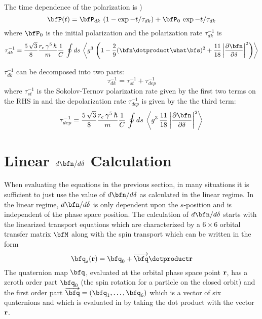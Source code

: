 {The time dependence of the polarization is \cite{b:barber99})
\begin{equation}
  \bfP(t) = \bfP_{dk} \, \left( 1 - \exp{-t/\tau_{dk}} \right) + \bfP_0 \, \exp{-t/\tau_{dk}}
\end{equation}
where $\bfP_0$ is the initial polarization and the polarization rate $\tau_{dk}^{-1}$ is 
\begin{equation}
  \tau_{dk}^{-1} = \frac{5 \, \sqrt{3}}{8} \frac{r_e \, \gamma^5 \, \hbar}{m}
  \frac{1}{C} \, \oint ds \, \left< g^3 \, \left( 1 - \frac{2}{9} (\bfn \dotproduct \what\bfs)^2 + 
  \frac{11}{18} \left| \frac{\partial \bfn}{\partial \delta} \right|^2 \right) \right>
  \label{t583}
\end{equation}

$\tau_{dk}^{-1}$ can be decomposed into two parts:
\begin{equation}
  \tau_{dk}^{-1} = \tau_{st}^{-1} + \tau_{dep}^{-1}
  \label{tdk}
\end{equation}
where $\tau_{st}^{-1}$ is the Sokolov-Ternov polarization rate given by the first two terms on the
RHS in  and the depolarization rate $\tau_{dep}^{-1}$ is given by the the third term:
\begin{equation}
  \tau_{dep}^{-1} = \frac{5 \, \sqrt{3}}{8} \frac{r_e \, \gamma^5 \, \hbar}{m}
  \frac{1}{C} \, \oint ds \, \left< g^3 \,
  \frac{11}{18} \left| \frac{\partial \bfn}{\partial \delta} \right|^2 \right>
  \label{tdep}
\end{equation}

\section{Linear $d\bfn/d\delta$ Calculation}
\label{s:dn.calc}

When evaluating the equations in the previous section, in many situations it is sufficient to just
use the value of $d\bfn/d\delta$ as calculated in the linear regime. In the linear regime,
$d\bfn/d\delta$ is only dependent upon the $s$-position and is independent of the phase space
position. The calculation of $d\bfn/d\delta$ starts with the linearized transport equations which
are characterized by a $6\times6$ orbital transfer matrix $\bfM$ along with the spin transport which
can be written in the form
\begin{equation}
  \bfq_s(\bfr) = \bfq_0 + \overrightarrow{\bfq} \dotproduct \bfr
  \label{qqqr}
\end{equation}
The quaternion map $\bfq$, evaluated at the orbital phase space point ${\bf r}$, has a zeroth order
part $\bfq_0$ (the spin rotation for a particle on the closed orbit) and the first order part
$\overrightarrow{\bfq} = (\bfq_1, \ldots, \bfq_6)$ which is a vector of six quaternions and which is
evaluated in  by taking the dot product with the vector ${\bf r}$.

}
